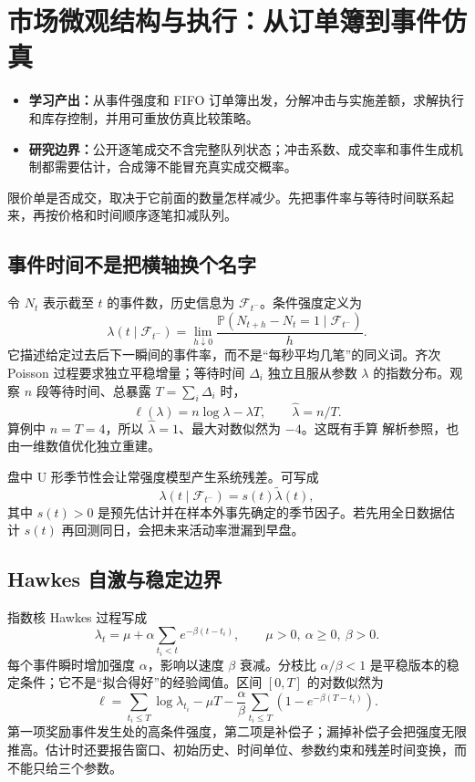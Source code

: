 \chapter{市场微观结构与执行：从订单簿到事件仿真}
\label{ch:lower-microstructure-events}

\begin{itemize}
  
  \item \textbf{学习产出：}从事件强度和 FIFO 订单簿出发，分解冲击与实施差额，求解执行和库存控制，并用可重放仿真比较策略。
  \item \textbf{研究边界：}公开逐笔成交不含完整队列状态；冲击系数、成交率和事件生成机制都需要估计，合成簿不能冒充真实成交概率。
\end{itemize}

限价单是否成交，取决于它前面的数量怎样减少。先把事件率与等待时间联系起来，再按价格和时间顺序逐笔扣减队列。


\section{事件时间不是把横轴换个名字}

令 $N_t$ 表示截至 $t$ 的事件数，历史信息为 $\mathcal F_{t^-}$。条件强度定义为
\[
 \lambda(t\mid\mathcal F_{t^-})
 =\lim_{h\downarrow0}\frac{\mathbb P(N_{t+h}-N_t=1\mid\mathcal F_{t^-})}{h}.
\]
它描述给定过去后下一瞬间的事件率，而不是“每秒平均几笔”的同义词。齐次 Poisson 过程要求独立平稳增量；等待时间 $\Delta_i$ 独立且服从参数 $\lambda$ 的指数分布。观察 $n$ 段等待时间、总暴露 $T=\sum_i\Delta_i$ 时，
\[
 \ell(\lambda)=n\log\lambda-\lambda T,
 \qquad \widehat\lambda=n/T.
\]
算例中 $n=T=4$，所以 $\widehat\lambda=1$、最大对数似然为 $-4$。这既有手算 解析参照，也由一维数值优化独立重建。

盘中 U 形季节性会让常强度模型产生系统残差。可写成
\[
 \lambda(t\mid\mathcal F_{t^-})=s(t)\widetilde\lambda(t),
\]
其中 $s(t)>0$ 是预先估计并在样本外事先确定的季节因子。若先用全日数据估计 $s(t)$ 再回测同日，会把未来活动率泄漏到早盘。

\section{Hawkes 自激与稳定边界}

指数核 Hawkes 过程写成
\[
 \lambda_t=\mu+\alpha\sum_{t_i<t}e^{-\beta(t-t_i)},
 \qquad \mu>0,\ \alpha\ge0,\ \beta>0.
\]
每个事件瞬时增加强度 $\alpha$，影响以速度 $\beta$ 衰减。分枝比 $\alpha/\beta<1$ 是平稳版本的稳定条件；它不是“拟合得好”的经验阈值。区间 $[0,T]$ 的对数似然为
\[
 \ell=\sum_{t_i\le T}\log\lambda_{t_i}
 -\mu T-\frac{\alpha}{\beta}\sum_{t_i\le T}\left(1-e^{-\beta(T-t_i)}\right).
\]
第一项奖励事件发生处的高条件强度，第二项是补偿子；漏掉补偿子会把强度无限推高。估计时还要报告窗口、初始历史、时间单位、参数约束和残差时间变换，而不能只给三个参数。

